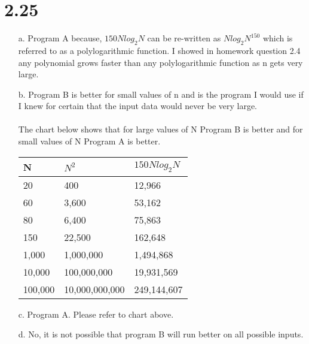 \documentclass[12pt,letterpaper]{article}
\begin{document}
\section*{2.25}
\begin{itemize}
\item[a.] Program A because, $\displaystyle 150Nlog_2N$ can be re-written as $Nlog_2N^{150}$ which is referred to as a polylogarithmic function. I showed in homework question 2.4 any polynomial grows faster than any polylogarithmic function as n gets very large.
\item[b.] Program B is better for small values of n and is the program I would use if I knew for certain that the input data would never be very large.\\\\
The chart below shows that for large values of N Program B is better and for small values of N Program A is better.
\begin{center}
\begin{tabular}{||p{1.2cm}|p{2.4cm}|p{2.8cm}||}
\hline
\textbf{N} & \textbf{$N^2$} & \textbf{$150Nlog_2N$} \\ \hline
20 & 400 & 12,966 \\ \hline
60 & 3,600 & 53,162 \\ \hline
80 & 6,400 & 75,863 \\ \hline
150 & 22,500 & 162,648 \\ \hline
1,000 & 1,000,000 & 1,494,868 \\ \hline
10,000 & 100,000,000 & 19,931,569 \\ \hline
100,000 & 10,000,000,000 & 249,144,607 \\ \hline
\end{tabular}
\end{center}
\item[c.] Program A. Please refer to chart above.
\item[d.] No, it is not possible that program B will run better on all possible inputs.
\end{itemize}
\end{document}
